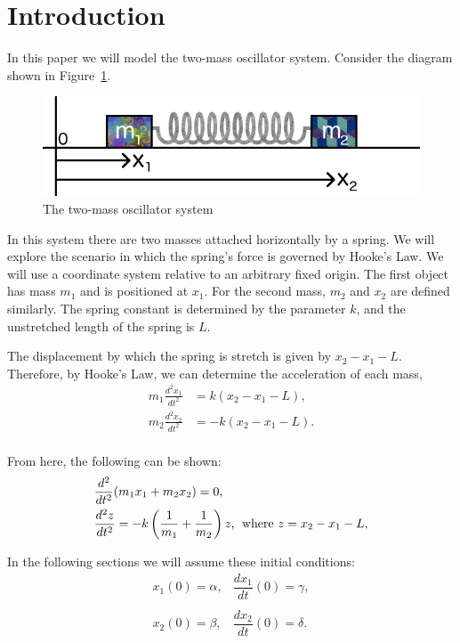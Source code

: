 \documentclass[11pt, oneside]{article}   	%
\begin{document}
\section{Introduction}
In this paper we will model the two-mass oscillator system.
Consider the diagram shown in Figure~\ref{sketch}.

\begin{figure}[h!]
\centering \includegraphics[scale=0.7]{sketch}
\caption{\label{sketch} The two-mass oscillator system}
\end{figure}

In this system there are two masses attached horizontally by a spring.
We will explore the scenario in which the spring's force is governed by Hooke's Law.
We will use a coordinate system relative to an arbitrary fixed origin.
The first object has mass $m_1$ and is positioned at $x_1$.
For the second mass, $m_2$ and $x_2$ are defined similarly.
The spring constant is determined by the parameter $k$, and the unstretched length of the spring is $L$.

The displacement by which the spring is stretch is given by $x_2 - x_1 -L$.
Therefore, by Hooke's Law, we can determine the acceleration of each mass,
\begin{align*}
m_1 \frac{d^2x_1}{dt^2} &= k(x_2 - x_1 - L), \\
m_2 \frac{d^2x_2}{dt^2} &= -k(x_2 - x_1 - L). \\
\end{align*}

From here, the following can be shown:
\begin{align}
&\frac{d^2}{dt^2}(m_1x_1 + m_2x_2) = 0, \\
&\frac{d^2z}{dt^2} = -k\left(\frac{1}{m_1}+\frac{1}{m_2}\right)z \text{, \;where } z = x_2-x_1-L,
\end{align}

In the following sections we will assume these initial conditions:
$$\begin{matrix}
x_1(0) = \alpha, & \dfrac{dx_1}{dt}(0) = \gamma, \\ &\\
x_2(0) = \beta, & \dfrac{dx_2}{dt}(0) = \delta.
\end{matrix}$$
\end{document}
